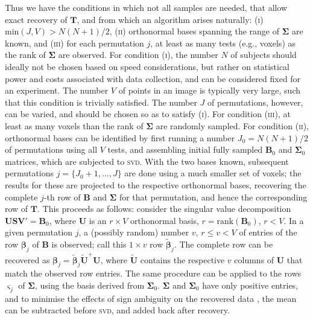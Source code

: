 Thus we have the conditions in which not all samples are needed, that allow exact recovery of $\mathbf{T}$, and from which an algorithm arises naturally: (\textsc{i}) $\text{min}(J,V) > N(N+1)/2$, (\textsc{ii}) orthonormal bases spanning the range of $\boldsymbol{\Sigma}$ are known, and (\textsc{iii}) for each permutation $j$, at least as many tests (e.g., voxels) as the rank of $\boldsymbol{\Sigma}$ are observed. For condition (\textsc{i}), the number $N$ of subjects should ideally not be chosen based on speed considerations, but rather on statistical power and costs associated with data collection, and can be considered fixed for an experiment. The number $V$ of points in an image is typically very large, such that this condition is trivially satisfied. The number $J$ of permutations, however, can be varied, and should be chosen so as to satisfy (\textsc{i}). For condition (\textsc{iii}), at least as many voxels than the rank of $\boldsymbol{\Sigma}$ are randomly sampled. For condition (\textsc{ii}), orthonormal bases can be identified by first running a number $J_0 = N(N+1)/2$ of permutations using all $V$ tests, and assembling initial fully sampled $\mathbf{B}_0$ and $\boldsymbol{\Sigma}_0$ matrices, which are subjected to \textsc{svd}. With the two bases known, subsequent permutations $j = \{J_0+1,\ldots,J\}$ are done using a much smaller set of voxels; the results for these are projected to the respective orthonormal bases, recovering the complete $j$-th row of $\mathbf{B}$ and $\boldsymbol{\Sigma}$ for that permutation, and hence the corresponding row of $\mathbf{T}$. This proceeds as follows: consider the singular value decomposition $\mathbf{U}\mathbf{S}\mathbf{V}'=\mathbf{B}_0$, where $\mathbf{U}$ is an $r \times V$ orthonormal basis, $r=\text{rank}(\mathbf{B}_0)$, $r<V$. In a given permutation $j$, a (possibly random) number $v$, $r \leqslant v < V$ of entries of the row $\boldsymbol{\beta}_j$ of $\mathbf{B}$ is observed; call this $1 \times v$ row $\tilde{\boldsymbol{\beta}}_j$. The complete row can be recovered as $\boldsymbol{\beta}_j = \tilde{\boldsymbol{\beta}}_j\tilde{\mathbf{U}}^+\mathbf{U}$, where $\tilde{\mathbf{U}}$ contains the respective $v$ columns of $\mathbf{U}$ that match the observed row entries. The same procedure can be applied to the rows $\boldsymbol{\varsigma}_j$ of $\boldsymbol{\Sigma}$, using the basis derived from $\boldsymbol{\Sigma}_0$. $\boldsymbol{\Sigma}$ and $\boldsymbol{\Sigma}_0$ have only positive entries, and to minimise the effects of sign ambiguity on the recovered data \citep[for a description of the problem, see][]{Bro2007}, the mean can be subtracted before \textsc{svd}, and added back after recovery.

